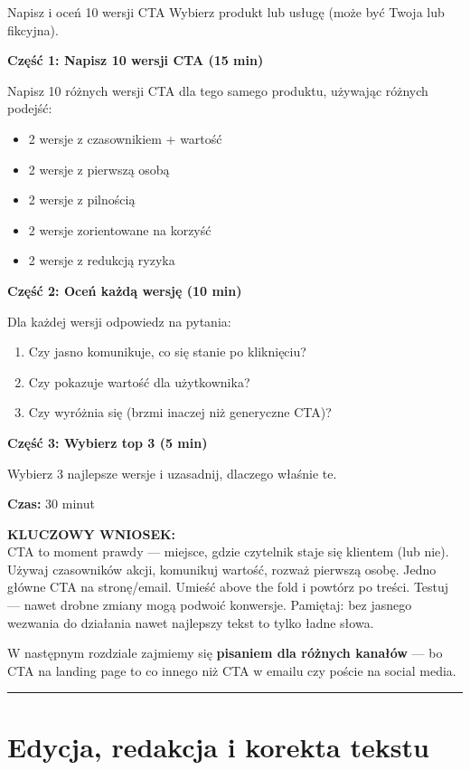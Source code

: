 \documentclass[
  12pt,
  a4paper,
  twoside,
  openright,
  12pt,
  DIV=12,
  BCOR=12mm]{scrbook}
\newcommand{\decoline}{%
  \begin{center}
    \textcolor{bordergray}{\rule{0.3\textwidth}{0.5pt}}
  \end{center}
}
\newcommand{\takeaway}[1]{%
  \begin{tcolorbox}[
    enhanced,
    colback=accentgreen!10,
    colframe=accentgreen,
    boxrule=0pt,
    borderline south={3pt}{0pt}{accentgreen},
    sharp corners,
    left=15pt, right=15pt, top=10pt, bottom=10pt
  ]
    \textbf{\color{accentgreen}KLUCZOWY WNIOSEK:}\\[5pt]
    #1
  \end{tcolorbox}
}
\begin{document}
\begin{cwiczenie}{Napisz i oceń 10 wersji CTA}
Wybierz produkt lub usługę (może być Twoja lub fikcyjna).

\textbf{Część 1: Napisz 10 wersji CTA (15 min)}

Napisz 10 różnych wersji CTA dla tego samego produktu, używając różnych podejść:
\begin{itemize}
  \item 2 wersje z czasownikiem + wartość
  \item 2 wersje z pierwszą osobą
  \item 2 wersje z pilnością
  \item 2 wersje zorientowane na korzyść
  \item 2 wersje z redukcją ryzyka
\end{itemize}

\textbf{Część 2: Oceń każdą wersję (10 min)}

Dla każdej wersji odpowiedz na pytania:
\begin{enumerate}
  \item Czy jasno komunikuje, co się stanie po kliknięciu?
  \item Czy pokazuje wartość dla użytkownika?
  \item Czy wyróżnia się (brzmi inaczej niż generyczne CTA)?
\end{enumerate}

\textbf{Część 3: Wybierz top 3 (5 min)}

Wybierz 3 najlepsze wersje i uzasadnij, dlaczego właśnie te.

\textbf{Czas:} 30 minut
\end{cwiczenie}

\takeaway{CTA to moment prawdy --- miejsce, gdzie czytelnik staje się klientem (lub nie). Używaj czasowników akcji, komunikuj wartość, rozważ pierwszą osobę. Jedno główne CTA na stronę/email. Umieść above the fold i powtórz po treści. Testuj --- nawet drobne zmiany mogą podwoić konwersje. Pamiętaj: bez jasnego wezwania do działania nawet najlepszy tekst to tylko ładne słowa.}

W następnym rozdziale zajmiemy się \textbf{pisaniem dla różnych kanałów}
--- bo CTA na landing page to co innego niż CTA w emailu czy poście na
social media.

\decoline


\chapter{Edycja, redakcja i korekta
tekstu}\label{edycja-redakcja-i-korekta-tekstu}
\end{document}
